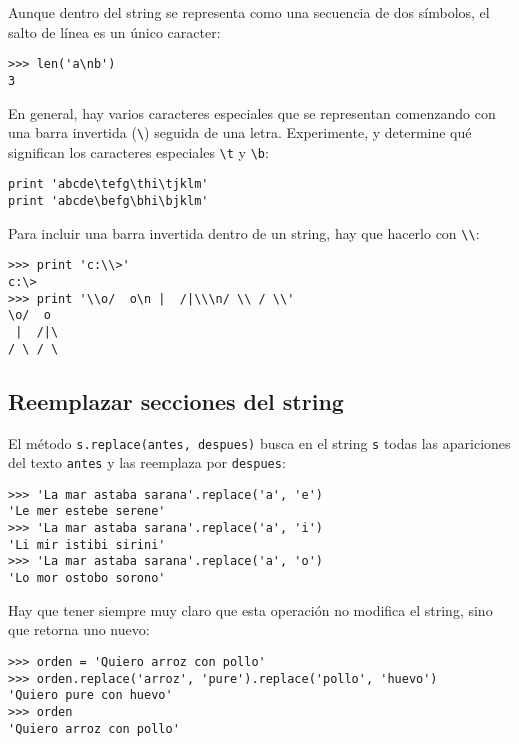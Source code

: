 Aunque dentro del string se representa como una secuencia de dos
símbolos, el salto de línea es un único caracter:

\begin{lstlisting}
>>> len('a\nb')
3
\end{lstlisting}

En general, hay varios caracteres especiales que se representan
comenzando con una barra invertida (\lstinline!\!) seguida de una letra.
Experimente, y determine qué significan los caracteres especiales
\lstinline!\t! y \lstinline!\b!:

\begin{lstlisting}
print 'abcde\tefg\thi\tjklm'
print 'abcde\befg\bhi\bjklm'
\end{lstlisting}

Para incluir una barra invertida dentro de un string, hay que hacerlo
con \lstinline!\\!:

\begin{lstlisting}
>>> print 'c:\\>'
c:\>
>>> print '\\o/  o\n |  /|\\\n/ \\ / \\'
\o/  o
 |  /|\
/ \ / \
\end{lstlisting}

\subsection{Reemplazar secciones del string}

El método \lstinline!s.replace(antes, despues)! busca en el string
\lstinline!s! todas las apariciones del texto \lstinline!antes! y las
reemplaza por \lstinline!despues!:

\begin{lstlisting}
>>> 'La mar astaba sarana'.replace('a', 'e')
'Le mer estebe serene'
>>> 'La mar astaba sarana'.replace('a', 'i')
'Li mir istibi sirini'
>>> 'La mar astaba sarana'.replace('a', 'o')
'Lo mor ostobo sorono'
\end{lstlisting}

Hay que tener siempre muy claro que esta operación no modifica el
string, sino que retorna uno nuevo:

\begin{lstlisting}
>>> orden = 'Quiero arroz con pollo'
>>> orden.replace('arroz', 'pure').replace('pollo', 'huevo')
'Quiero pure con huevo'
>>> orden
'Quiero arroz con pollo'
\end{lstlisting}

